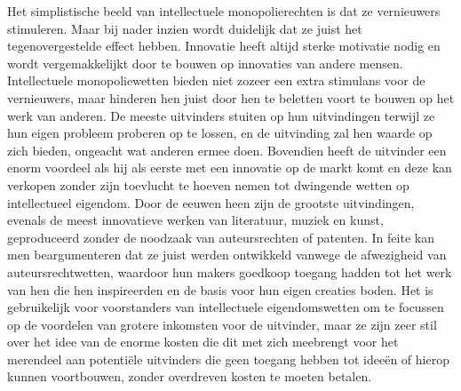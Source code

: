 Het simplistische beeld van intellectuele monopolierechten is dat ze vernieuwers stimuleren. Maar bij nader inzien wordt duidelijk dat ze juist het tegenovergestelde effect hebben. Innovatie heeft altijd sterke motivatie nodig en wordt vergemakkelijkt door te bouwen op innovaties van andere mensen. Intellectuele monopoliewetten bieden niet zozeer een extra stimulans voor de vernieuwers, maar hinderen hen juist door hen te beletten voort te bouwen op het werk van anderen. De meeste uitvinders stuiten op hun uitvindingen terwijl ze hun eigen probleem proberen op te lossen, en de uitvinding zal hen waarde op zich bieden, ongeacht wat anderen ermee doen. Bovendien heeft de uitvinder een enorm voordeel als hij als eerste met een innovatie op de markt komt en deze kan verkopen zonder zijn toevlucht te hoeven nemen tot dwingende wetten op intellectueel eigendom. Door de eeuwen heen zijn de grootste uitvindingen, evenals de meest innovatieve werken van literatuur, muziek en kunst, geproduceerd zonder de noodzaak van auteursrechten of patenten. In feite kan men beargumenteren dat ze juist werden ontwikkeld vanwege de afwezigheid van auteursrechtwetten, waardoor hun makers goedkoop toegang hadden tot het werk van hen die hen inspireerden en de basis voor hun eigen creaties boden. Het is gebruikelijk voor voorstanders van intellectuele eigendomswetten om te focussen op de voordelen van grotere inkomsten voor de uitvinder, maar ze zijn zeer stil over het idee van de enorme kosten die dit met zich meebrengt voor het merendeel aan potentiële uitvinders die geen toegang hebben tot ideeën of hierop kunnen voortbouwen, zonder overdreven kosten te moeten betalen.

